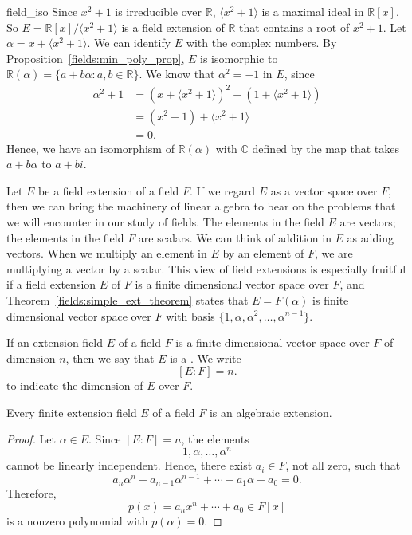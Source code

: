\begin{example}{field_iso}
Since $x^2 + 1$ is irreducible over ${\mathbb R}$, $\langle x^2 + 1
\rangle$ is a maximal ideal in ${\mathbb R}[x]$. So $E = {\mathbb
R}[x]/\langle x^2 + 1 \rangle$ is a field extension of ${\mathbb R}$ that
contains a root of $x^2 + 1$. Let $\alpha = x + \langle x^2 + 1
\rangle$. We can identify $E$ with the complex numbers. By
Proposition~\ref{fields:min_poly_prop}, $E$ is isomorphic to ${\mathbb R}( \alpha ) = \{ a + b
\alpha : a, b \in {\mathbb R} \}$. We know that $\alpha^2 = -1$ in $E$,
since 
\begin{align*}
\alpha^2 + 1 & = (x + \langle  x^2 +1  \rangle)^2 + ( 1  +
\langle  x^2 +1  \rangle)
\\
& = (x^2 + 1) +  \langle  x^2 + 1  \rangle \\
& = 0.
\end{align*}
Hence, we have an isomorphism of ${\mathbb R}( \alpha )$ with ${\mathbb C}$
defined by the map that takes $a + b \alpha$ to $a + bi$. 
\end{example}
 


Let $E$ be a field extension of a field $F$.  If we regard $E$ as a
vector space over $F$, then we can bring the machinery of linear
algebra to bear on the problems that we will encounter in our study of
fields. The elements in the field $E$ are vectors; the elements
in the field $F$ are scalars. We can think of addition in $E$ as
adding vectors.  When we multiply an element in $E$ by an element of
$F$, we are multiplying a vector by a scalar.  This view of field 
extensions is especially fruitful if a field extension $E$ of $F$ 
is a finite dimensional vector space over $F$, and Theorem~\ref{fields:simple_ext_theorem} states
that $E = F(\alpha )$ is finite dimensional vector space over $F$ with
basis $\{ 1, \alpha, {\alpha}^2, \ldots, {\alpha}^{n-1} \}$.  
 

If an extension field $E$ of a field $F$ is a finite dimensional
vector space over $F$ of dimension $n$, then we say that $E$ is a 
.  We write  
\[
[E:F]= n.\label{notedegext}
\]
to indicate the dimension of $E$ over $F$.
 

\begin{theorem}\label{fields:finite_ext_theorem}
Every finite extension field $E$ of a field $F$ is an algebraic extension. 
\end{theorem}
 

\begin{proof}
Let $\alpha \in E$. Since $[E:F] =n$, the elements
\[
1, \alpha, \ldots, {\alpha}^n
\]
cannot be linearly independent.  Hence, there exist $a_i \in F$, not
all zero, such that 
\[
a_n {\alpha}^n + a_{n-1} {\alpha}^{n-1} + \cdots + a_1 \alpha + a_0
=0. 
\]
Therefore,
\[
p(x) = a_n x^n + \cdots + a_0 \in F[x]
\]
is a nonzero polynomial with $p( \alpha ) = 0$.
\end{proof}


